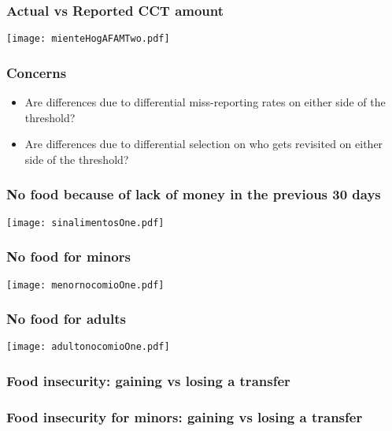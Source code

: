 \documentclass{beamer}
\begin{document}
\begin{frame}
\frametitle{Actual vs Reported CCT amount}
\begin{center}
\texttt{[image: mienteHogAFAMTwo.pdf]}
\label{mienteHogAFAMTwo}
\end{center}
\end{frame}

\begin{frame}
\frametitle{Concerns}
\begin{itemize}
\item {\color{gray}Are differences due to differential miss-reporting rates on either side of the threshold?}
\item Are differences due to differential selection on who gets revisited on either side of the threshold?
\end{itemize}
\end{frame}

\begin{frame}
\frametitle{No food because of lack of money in the previous 30 days}
\begin{center}
\texttt{[image: sinalimentosOne.pdf]}
\label{sinalimentosOne}
\end{center}
\end{frame}

\begin{frame}
\frametitle{No food for minors}
\begin{center}
\texttt{[image: menornocomioOne.pdf]}
\label{menornocomioOne}
\end{center}
\end{frame}

\begin{frame}
\frametitle{No food for adults}
\begin{center}
\texttt{[image: adultonocomioOne.pdf]}
\label{adultonocomioOne}
\end{center}
\end{frame}

\begin{frame}
\frametitle{Food insecurity: gaining vs losing a transfer}
\begin{figure}

\end{figure}
\end{frame}

\begin{frame}
\frametitle{Food insecurity for minors: gaining vs losing a transfer}
\begin{figure}

\end{figure}
\end{frame}
\end{document}
